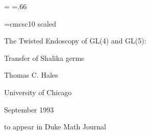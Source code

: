 
\magnification=
\baselineskip
\parskip=.66\baselineskip
{}  %
\raggedbottom        %

\UseAMSsymbols
\loadmsbm
\loadeufm
\font\headfont=cmcsc10 scaled

 \def\star{\hbox to 0pt{\hskip -10pt $\bullet$ \hss}}  %
 \def\leftmargin{$\bullet$
    \vadjust{\vbox to 0pt{\vskip-0.8\baselineskip\hbox to \hsize{\star\hfil}\vss}}}

\def\xx{\x\x\ }
\def\x{%
        \hskip .05em
        \vbox{\hrule height .4pt%
          \hbox{\vrule width .4pt%
                      \hskip .25em%
                      \vbox{\vskip .61em}%
                      \hskip .25em%
                      \vrule width .4pt%
                }
          \hrule height .4pt%
          }}

\def\v{\hskip -3.5pt }
\def\txt#1{\hbox{\quad \vbox{\hsize=.9\hsize\par #1 }\quad}}
\def\diabox#1to#2,#3,{
\smallskip
\hbox to \hsize
{\hfill
\vrule \vbox{ \hrule \vskip 6pt \txt#1 \vskip #2 %
     \special{psfile=#3 hoffset=5 voffset=5 }\hrule }
\v\vrule\hfill
}
\smallskip}
\def\jota{{\dot\iota}}
\def\P{{\Bbb P}}
\def\pp{{\frak p}}
\def\SS{{\frak S}}
\def\Q{{\Bbb Q}}
\def\G{{\Bbb G}}
\def\C{{\Bbb C}}
\def\Z{{\Bbb Z}}
\def\leftd#1{\left | {d#1\over #1^2}\right |}
\def\leftdx{\leftd x}
\def\leftdu{\leftd u}
\def\Gal{\hbox{Gal\,}}
\def\Im{{\Cal I\hskip-.2em m}}
\def\Ima{\hbox{Im}}
\def\LOG{{L\,}}
\def\bGamma{\bar\Gamma}
\def\diag{\hbox{diag}}
\def\so{{\frak s\frak o}}
\def\sp{{\frak s\frak p}}
\def\rank{\hbox{rank}}
\def\bF{{\bar F}}
\def\val{\operatorname{val}}
\def\Res{\operatorname{Res}}
\def\hq{%
        \hskip .05em
        \vbox{\hrule height .4pt%
          \hbox{\vrule width .4pt%
                      \hskip .25em%
                      \vbox{\vskip .61em}%
                      \hskip .25em%
                      \vrule width .4pt%
                }
          \hrule height .4pt%
          }}


\centerline{\headfont The Twisted Endoscopy of GL(4) and GL(5):}
\smallskip
\centerline{\headfont Transfer of Shalika germs}
\bigskip
\centerline{Thomas C. Hales}
\smallskip
\centerline{University of Chicago}
\smallskip
\centerline{September 1993}
\smallskip
\centerline{to appear in Duke Math Journal}
\line{\hfil \leaders\hrule\hskip1in \hfil}
\bigskip

